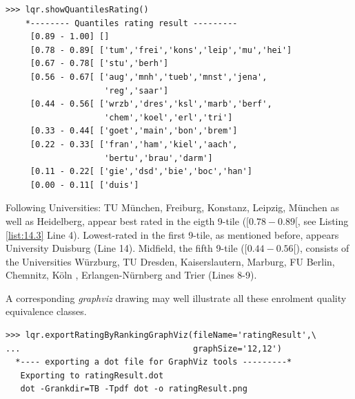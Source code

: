 \begin{lstlisting}[caption={Computing 9-tiles of the enrolment quality scores per subject},label=list:14.3]
>>> lqr.showQuantilesRating()
    *-------- Quantiles rating result ---------
     [0.89 - 1.00] []
     [0.78 - 0.89[ ['tum','frei','kons','leip','mu','hei']
     [0.67 - 0.78[ ['stu','berh']
     [0.56 - 0.67[ ['aug','mnh','tueb','mnst','jena',
                    'reg','saar']
     [0.44 - 0.56[ ['wrzb','dres','ksl','marb','berf',
                    'chem','koel','erl','tri']
     [0.33 - 0.44[ ['goet','main','bon','brem']
     [0.22 - 0.33[ ['fran','ham','kiel','aach',
                    'bertu','brau','darm']
     [0.11 - 0.22[ ['gie','dsd','bie','boc','han']
     [0.00 - 0.11[ ['duis']
\end{lstlisting}

Following Universities: TU München, Freiburg, Konstanz, Leipzig, München as well as Heidelberg, appear best rated in the eigth 9-tile ($[0.78 - 0.89[$, see Listing \ref{list:14.3} Line 4). Lowest-rated in the first 9-tile, as mentioned before, appears University Duisburg (Line 14). Midfield, the fifth 9-tile ($[0.44 - 0.56[$), consists of the Universities Würzburg, TU Dresden, Kaiserslautern, Marburg, FU Berlin, Chemnitz, Köln , Erlangen-Nürnberg and Trier (Lines 8-9).

A corresponding \emph{graphviz} drawing may well illustrate all these enrolment quality equivalence classes.

\begin{lstlisting}
>>> lqr.exportRatingByRankingGraphViz(fileName='ratingResult',\
...                                   graphSize='12,12')
  *---- exporting a dot file for GraphViz tools ---------*
   Exporting to ratingResult.dot
   dot -Grankdir=TB -Tpdf dot -o ratingResult.png
\end{lstlisting}

